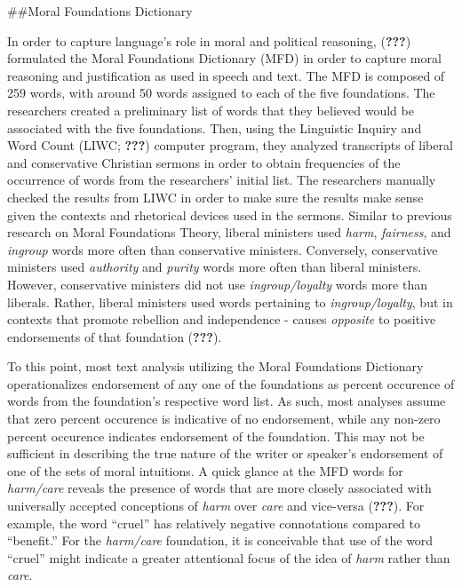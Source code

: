 \documentclass[,man]{apa6}
\theoremstyle{definition}
\theoremstyle{definition}
\theoremstyle{definition}
\theoremstyle{remark}
\begin{document}
\#\#Moral Foundations Dictionary

In order to capture language's role in moral and political reasoning,
({\textbf{???}}) formulated the Moral Foundations Dictionary (MFD) in
order to capture moral reasoning and justification as used in speech and
text. The MFD is composed of 259 words, with around 50 words assigned to
each of the five foundations. The researchers created a preliminary list
of words that they believed would be associated with the five
foundations. Then, using the Linguistic Inquiry and Word Count (LIWC;
{\textbf{???}}) computer program, they analyzed transcripts of liberal
and conservative Christian sermons in order to obtain frequencies of the
occurrence of words from the researchers' initial list. The researchers
manually checked the results from LIWC in order to make sure the results
make sense given the contexts and rhetorical devices used in the
sermons. Similar to previous research on Moral Foundations Theory,
liberal ministers used \emph{harm}, \emph{fairness}, and \emph{ingroup}
words more often than conservative ministers. Conversely, conservative
ministers used \emph{authority} and \emph{purity} words more often than
liberal ministers. However, conservative ministers did not use
\emph{ingroup/loyalty} words more than liberals. Rather, liberal
ministers used words pertaining to \emph{ingroup/loyalty}, but in
contexts that promote rebellion and independence - causes
\emph{opposite} to positive endorsements of that foundation
({\textbf{???}}).

To this point, most text analysis utilizing the Moral Foundations
Dictionary operationalizes endorsement of any one of the foundations as
percent occurence of words from the foundation's respective word list.
As such, most analyses assume that zero percent occurence is indicative
of no endorsement, while any non-zero percent occurence indicates
endorsement of the foundation. This may not be sufficient in describing
the true nature of the writer or speaker's endorsement of one of the
sets of moral intuitions. A quick glance at the MFD words for
\emph{harm/care} reveals the presence of words that are more closely
associated with universally accepted conceptions of \emph{harm} over
\emph{care} and vice-versa ({\textbf{???}}). For example, the word
\enquote{cruel} has relatively negative connotations compared to
\enquote{benefit.} For the \emph{harm/care} foundation, it is
conceivable that use of the word \enquote{cruel} might indicate a
greater attentional focus of the idea of \emph{harm} rather than
\emph{care}.
\end{document}
